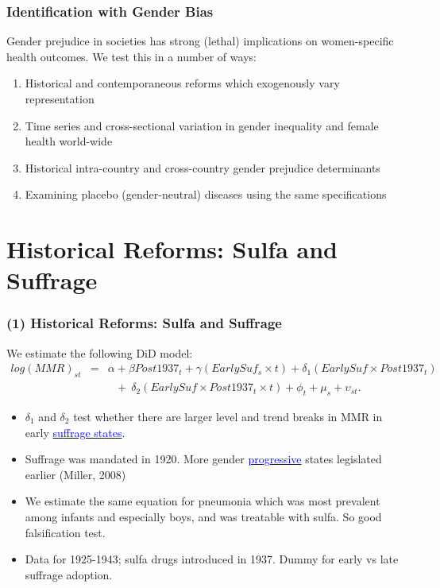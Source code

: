 \documentclass[10pt,letterpaper,subeqn]{beamer}
\begin{document}
\begin{frame}
\frametitle{Identification with Gender Bias}
Gender prejudice in societies has strong (lethal) implications on women-specific 
health outcomes.  We test this in a number of ways:
\vspace{4.5mm}
\begin{enumerate}
  \setlength{\itemsep}{9.5pt}
  \item Historical and contemporaneous reforms which exogenously vary representation
  \item Time series and cross-sectional variation in gender inequality and female
        health world-wide
  \item Historical intra-country and cross-country gender prejudice determinants
  \item Examining placebo (gender-neutral) diseases using the same specifications
\end{enumerate}
\end{frame}

\section{Historical Reforms: Sulfa and Suffrage}

\begin{frame}[label=USAHistory]
\frametitle{(1) Historical Reforms: Sulfa and Suffrage}

We estimate the following DiD model:
{\scriptsize
\begin{eqnarray}
log(MMR)_{st} & = &\alpha + \beta Post1937_t + \gamma(EarlySuf_{s}\times t)
                + \delta_1 (EarlySuf\times Post1937_t) \nonumber \\
              & &\ \ \ + \ \delta_2 (EarlySuf\times Post1937_t\times t) + \phi_t + \mu_s
                + \upsilon_{st}. \nonumber
\end{eqnarray}
}
\begin{itemize}
\setlength{\itemsep}{10pt}
  \item $\delta_1$ and $\delta_2$ test whether there are larger level and trend 
        breaks in MMR in early  \hyperlink{SuffrageUS}{\textcolor{blue}{suffrage states}}.
  \item Suffrage was mandated in 1920.  More gender \hyperlink{WhySuffrage}{\textcolor{blue}{progressive}} states legislated
        earlier (Miller, 2008)
  \item We estimate the same equation for pneumonia which was most prevalent 
        among infants and especially boys, and was treatable with sulfa. So good 
        falsification test.
  \item Data for 1925-1943; sulfa drugs introduced in 1937. Dummy for early vs 
        late suffrage adoption.
\end{itemize}
\end{frame}
\end{document}
